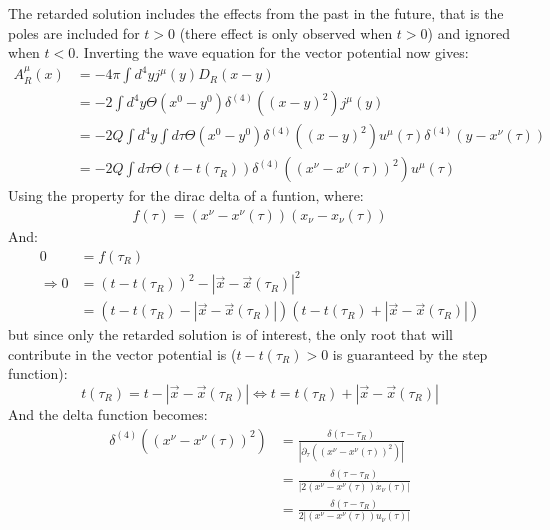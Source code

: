 \documentclass[12pt,a4]{article}
\begin{document}
\begin{enumerate}
\begin{enumerate}
        The retarded solution includes the effects from the past in the future, that is the poles are included for $t > 0$ (there effect is only observed when $t > 0$) and ignored when $t < 0$.
        Inverting the wave equation for the vector potential now gives:
        \begin{align*}
          A^\mu_R(x) &= -4\pi \int d^4 y j^\mu (y) D_R(x - y)\\
                     &= -2 \int d^4 y \Theta(x^{0} - y^{0})\delta^{(4)}\left((x - y)^2\right)j^\mu (y) \\
                     &= -2 Q\int d^4 y \int d\tau \Theta(x^{0} - y^{0})\delta^{(4)}\left((x - y)^2\right)   u^\mu(\tau) \delta^{(4)} (y - x^{\nu}(\tau))\\
                     &= -2 Q \int d\tau \Theta(t - t(\tau_R))\delta^{(4)}\left((x^\nu - x^{\nu}(\tau))^2\right) u^\mu(\tau)
        \end{align*}
        Using the property for the dirac delta of a funtion, where:
        \begin{align*}
          f(\tau) = (x^\nu - x^{\nu}(\tau))(x_\nu - x_{\nu}(\tau)) 
        \end{align*}
        And:
        \begin{align*}
          0 &= f(\tau_R)\\ 
          \Rightarrow 0 &= (t - t(\tau_R))^2 - |\vec{x} - \vec{x}(\tau_R)|^2 \\
                          &= (t - t(\tau_R) - |\vec{x} - \vec{x}(\tau_R)|) (t - t(\tau_R) + |\vec{x} - \vec{x}(\tau_R)|)
        \end{align*}
        but since only the retarded solution is of interest, the only root that will contribute in the vector potential is ($t - t(\tau_R) > 0$ is guaranteed by the step function):
        \begin{equation*}
          t(\tau_R) = t  - |\vec{x} - \vec{x}(\tau_R)| \Leftrightarrow t = t(\tau_R) + |\vec{x} - \vec{x}(\tau_R)|
        \end{equation*}
       And the delta function becomes:
        \begin{align*}
          \delta^{(4)}\left((x^\nu - x^{\nu}(\tau))^2\right)  &= \frac{\delta(\tau - \tau_R)}{\left|\partial_\tau\left((x^\nu - x^{\nu}(\tau))^2\right)\right|} \\
                                                              &= \frac{\delta(\tau - \tau_R)}{\left|2(x^\nu - x^{\nu}(\tau))\dot{x}_{\nu}(\tau)\right|} \\
                                                              &= \frac{\delta(\tau - \tau_R)}{2\left|(x^\nu - x^{\nu}(\tau))u_{\nu}(\tau)\right|}

\end{align*}
\end{enumerate}
\end{enumerate}
\end{document}
